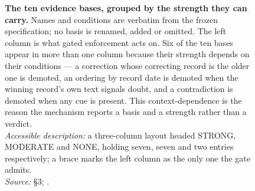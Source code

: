 \begin{figure}[t]

\vspace{1mm}
\caption[The ten evidence bases of Evarb-0.2]{%
\textbf{The ten evidence bases, grouped by the strength they can carry.} Names and conditions are verbatim from
the frozen specification; no basis is renamed, added or omitted. The left column is what gated enforcement acts on.
Six of the ten bases appear in more than one column because their strength depends on their conditions --- a
correction whose correcting record is the older one is demoted, an ordering by record date is demoted when the
winning record's own text signals doubt, and a contradiction is demoted when any cue is present. This
context-dependence is the reason the mechanism reports a basis and a strength rather than a verdict.\\
\emph{Accessible description:} a three-column layout headed STRONG, MODERATE and NONE, holding seven, seven and two
entries respectively; a brace marks the left column as the only one the gate admits.\\
\emph{Source:}  \S3; .}
\label{fig:bases}
\end{figure}

